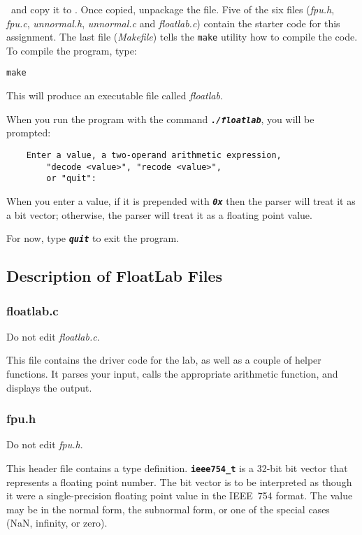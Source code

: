 \filesource\ and copy it to \runtimeenvironment.
Once copied, unpackage the file.
Five of the six files (\textit{fpu.h}, \textit{fpu.c}, \textit{unnormal.h}, \textit{unnormal.c} and \textit{floatlab.c}) contain the starter code for this assignment.
The last file (\textit{Makefile}) tells the \texttt{make} utility how to compile the code.
To compile the program, type:

\texttt{make}

This will produce an executable file called \textit{floatlab}.

When you run the program with the command \texttt{\textbf{\textit{./floatlab}}}, you will be prompted:

\begin{verbatim}
    Enter a value, a two-operand arithmetic expression,
        "decode <value>", "recode <value>",
        or "quit":
\end{verbatim}

When you enter a value, if it is prepended with \texttt{\textbf{\textit{0x}}} then the parser will treat it as a bit vector;
otherwise, the parser will treat it as a floating point value.

For now, type \texttt{\textbf{\textit{quit}}} to exit the program.

\subsection{Description of FloatLab Files}

\subsubsection{floatlab.c}

Do not edit \textit{floatlab.c}.

This file contains the driver code for the lab, as well as a couple of helper functions.
It parses your input, calls the appropriate arithmetic function, and displays the output.

\subsubsection{fpu.h}\label{subsubsec:fpu.h}

Do not edit \textit{fpu.h}.

This header file contains a type definition.
\textbf{\texttt{ieee754\_t}} is a 32-bit bit vector that represents a floating point number.
The bit vector is to be interpreted as though it were a single-precision floating point value in the IEEE~754 format.
The value may be in the normal form, the subnormal form, or one of the special cases (NaN, infinity, or zero).

